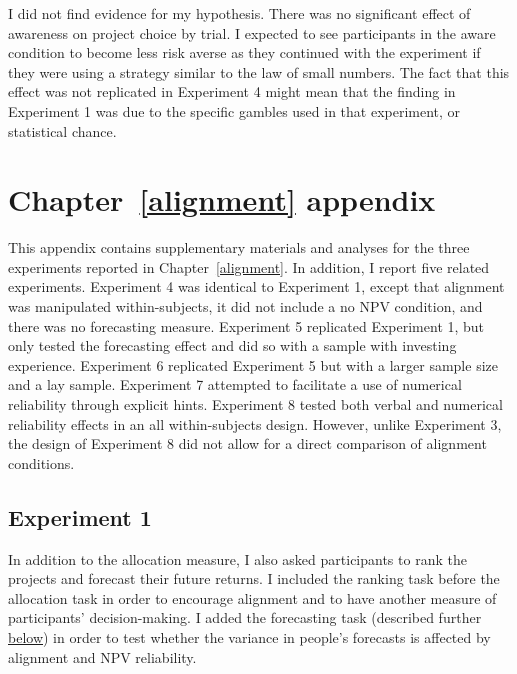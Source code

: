 \documentclass[a4paper, nobind, dvipsnames]{templates/ociamthesis}
\theoremstyle{definition}
\theoremstyle{definition}
\theoremstyle{definition}
\theoremstyle{definition}
\theoremstyle{remark}
\begin{document}
I did not find evidence for my hypothesis. There was no significant effect of
awareness on project choice by trial. I expected to see participants in the
aware condition to become less risk averse as they continued with the experiment
if they were using a strategy similar to the law of small numbers. The fact that
this effect was not replicated in Experiment 4 might mean that the finding in
Experiment 1 was due to the specific gambles used in that experiment, or
statistical chance.

\hypertarget{alignment-appendix}{%
\chapter{Chapter~\ref{alignment} appendix}\label{alignment-appendix}}

\minitoc

This appendix contains supplementary materials and analyses for the three
experiments reported in Chapter~\ref{alignment}. In addition, I report five
related experiments. Experiment 4 was identical to Experiment 1, except that
alignment was manipulated within-subjects, it did not include a no NPV
condition, and there was no forecasting measure. Experiment 5 replicated
Experiment 1, but only tested the forecasting effect and did so with a sample
with investing experience. Experiment 6 replicated Experiment 5 but with a
larger sample size and a lay sample. Experiment 7 attempted to facilitate a use
of numerical reliability through explicit hints. Experiment 8 tested both verbal
and numerical reliability effects in an all within-subjects design. However,
unlike Experiment 3, the design of Experiment 8 did not allow for a direct
comparison of alignment conditions.

\hypertarget{alignment-2-appendix}{%
\section{Experiment 1}\label{alignment-2-appendix}}

In addition to the allocation measure, I also asked participants to rank the
projects and forecast their future returns. I included the ranking task before
the allocation task in order to encourage alignment and to have another measure
of participants' decision-making. I added the forecasting task (described
further \protect\hyperlink{forecasting-materials-alignment-2}{below}) in order to test whether
the variance in people's forecasts is affected by alignment and NPV reliability.
\end{document}
